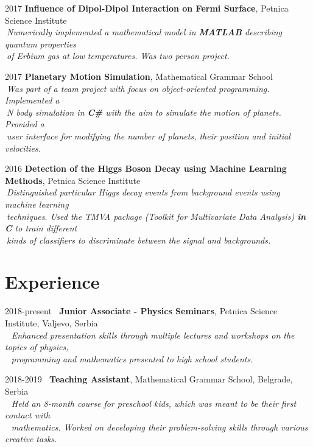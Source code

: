 \documentclass[10pt]{article}
\begin{document}
\tabbedblock
{
2017 \>  \textbf{Influence of Dipol-Dipol Interaction on Fermi Surface}, Petnica Science Institute\\[2pt]
\>\+
$\:$\textit{Numerically implemented a mathematical model in \textbf{MATLAB} describing quantum properties} \\
$\:$\textit{of Erbium gas at low temperatures. Was two person project.}
}

\tabbedblock
{
2017 \>  \textbf{Planetary Motion Simulation}, Mathematical Grammar School\\[2pt]
\>\+
$\:$\textit{Was part of a team project with focus on object-oriented programming. Implemented a} \\
$\:$\textit{N body simulation in \textbf{C\#} with the aim to simulate the motion of planets. Provided a} \\
$\:$\textit{user interface for modifying the number of planets, their position and initial velocities.}

}

\tabbedblock
{
2016 \>  \textbf{Detection of the Higgs Boson Decay using Machine Learning Methods}, Petnica Science Institute\\[2pt]
\>\+
$\:$\textit{Distinguished particular Higgs decay events from background events using machine learning} \\
$\:$\textit{techniques. Used the TMVA package (Toolkit for Multivariate Data Analysis) \textbf{in C} to train different} \\
$\:$\textit{kinds of classifiers to discriminate between the signal and backgrounds.}
}

\section{Experience}

\tabbedblock
{
2018-present \> $\:$ \textbf{Junior Associate - Physics Seminars}, Petnica Science Institute, Valjevo, Serbia\\[2pt]
\>\+
$\:$ $\:$\textit{Enhanced presentation skills through multiple lectures and workshops on the topics of physics,}\\
$\:$ $\:$\textit{programming and mathematics presented to high school students.}
}

\tabbedblock
{
2018-2019  \> $\:$ \textbf{Teaching Assistant}, Mathematical Grammar School, Belgrade, Serbia\\[2pt]
\>\+
$\:$ $\:$\textit{Held an 8-month course for preschool kids, which was meant to be their first contact with}\\
$\:$ $\:$\textit{mathematics. Worked on developing their problem-solving skills through various creative tasks.}
}
\end{document}
